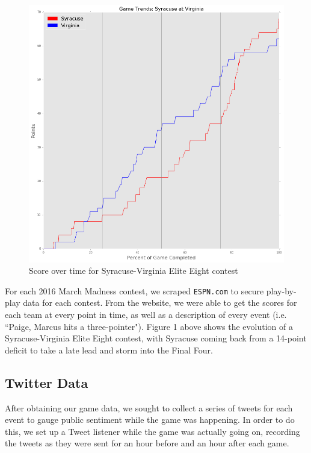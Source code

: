 \documentclass[12pt]{article}
\begin{document}
\begin{doublespacing}
\begin{figure} [H]
	\centering
	\includegraphics[scale = 0.4] {Images/Cuse_UVA_MarginOverTime.png} 
	\caption{Score over time for Syracuse-Virginia Elite Eight contest}
\end{figure}

For each 2016 March Madness contest, we scraped \texttt{ESPN.com} to secure play-by-play data for each contest. From the website, we were able to get the scores for each team at every point in time, as well as a description of every event (i.e. ``Paige, Marcus hits a three-pointer"). Figure 1 above shows the evolution of a Syracuse-Virginia Elite Eight contest, with Syracuse coming back from a 14-point deficit to take a late lead and storm into the Final Four. 

\subsection{Twitter Data}

After obtaining our game data, we sought to collect a series of tweets for each event to gauge public sentiment while the game was happening. In order to do this, we set up a Tweet listener while the game was actually going on, recording the tweets as they were sent for an hour before and an hour after each game. 


\end{doublespacing}
\end{document}
